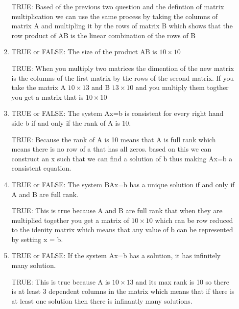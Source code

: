 \documentclass{article}
\begin{document}
\begin{enumerate}
\begin{enumerate}
        \vspace{0.5cm}
        \par
        TRUE: Based of the previous two question and the defintion of matrix multiplication we can use the same process by taking the columns of matrix A and multipling it by the rows of matrix B which shows that the row product of AB is the linear combination of the rows of B
        \vspace{0.5cm}
      \item TRUE or FALSE: The size of the product AB is $10 \times 10$
        \vspace{0.5cm}
        \par
        TRUE: When you multiply two matrices the dimention of the new matrix is the columns of the first matrix by the rows of the second matrix. If you take the matrix A $10 \times 13$ and B $13 \times 10$ and you multiply them togther you get a matrix that is $10 \times 10$
        \vspace{0.5cm}
      \item TRUE or FALSE: The system Ax=b is consistent for every right hand side b if and only if the rank of A is 10.
        \vspace{0.5cm}
        \par
        TRUE: Because the rank of A is 10 means that A is full rank which means there is no row of a that has all zeros. based on this we can construct an x such that we can find a solution of b thus making Ax=b a consistent equation.
        \vspace{0.5cm}
      \item TRUE or FALSE: The system BAx=b has a unique solution if and only if A and B are full rank.
        \vspace{0.5cm}
        \par
        TRUE: This is true because A and B are full rank that when they are multiplied together you get a matrix of $10 \times 10$ which can be row reduced to the idenity matrix which means that any value of b can be represented by setting x = b.
        \vspace{0.5cm}
      \item TRUE or FALSE: If the system Ax=b has a solution, it has infinitely many solution.
        \vspace{0.5cm}
        \par
        TRUE: This is true because A is $10 \times 13$ and its max rank is 10 so there is at least 3 dependent columns in the matrix which means that if there is at least one solution then there is infinantly many solutions.

\end{enumerate}
\end{enumerate}
\end{document}
